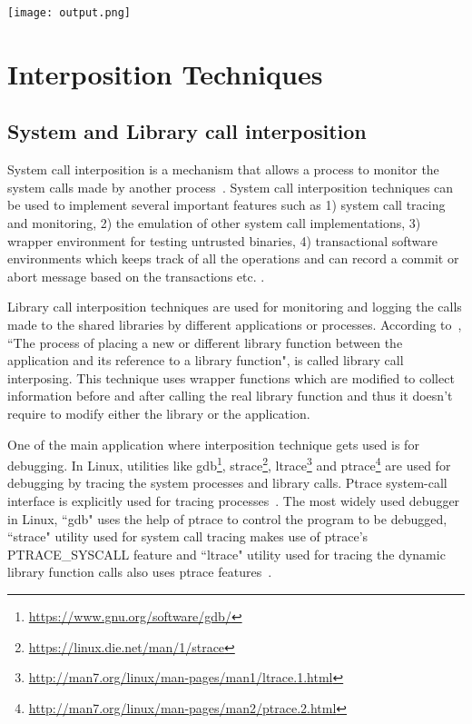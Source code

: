 \begin{center}
\texttt{[image: output.png]}
\label{fig:output}
\end{center}

\section{Interposition Techniques}

\subsection{System and Library call interposition}
System call interposition is a mechanism that allows a process to monitor the system calls made by another process~\cite{Jain00user-levelinfrastructure}. System call interposition techniques can be used to implement several important features such as 1) system call tracing and monitoring, 2) the emulation of other system call implementations, 3) wrapper environment for testing untrusted binaries, 4) transactional software environments which keeps track of all the operations and can record a commit or abort message based on the transactions etc. \cite{Jones93}.

Library call interposition techniques are used for monitoring and logging the calls made to the shared libraries by different applications or processes. According to~\cite{Curry:1994:PTD:1267257.1267275}, ``The process of placing a new or different library function between the application and its reference to a library function", is called library call interposing. This technique uses wrapper functions which are modified to collect information before and after calling the real library function and thus it doesn't require to modify either the library or the application.

One of the main application where interposition technique gets used is for debugging. In Linux, utilities like gdb\footnote{\url{https://www.gnu.org/software/gdb/}}, strace\footnote{\url{https://linux.die.net/man/1/strace}}, ltrace\footnote{\url{http://man7.org/linux/man-pages/man1/ltrace.1.html}} and ptrace\footnote{\url{http://man7.org/linux/man-pages/man2/ptrace.2.html}} are used for debugging by tracing the system processes and library calls. Ptrace system-call interface is explicitly used for tracing processes~\cite{Keniston_ptrace}. The most widely used debugger in Linux, ``gdb" uses the help of ptrace to control the program to be debugged, ``strace" utility used for system call tracing makes use of ptrace's PTRACE\_SYSCALL feature and ``ltrace" utility used for tracing the dynamic library function calls also uses ptrace features~\cite{Keniston_ptrace}.

